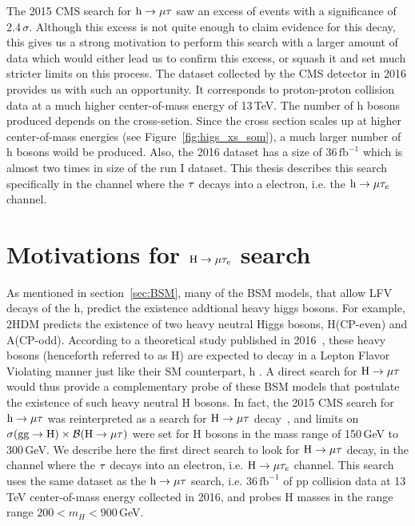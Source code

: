 The 2015 CMS search for $\text{h} \to \mu \tau$ saw an excess of events with a significance of 2.4\,$\sigma$. Although this excess is not quite enough to claim evidence for this decay, this gives us a strong motivation to perform this search with a larger amount of data which would either lead us to confirm this excess, or squash it and set much stricter limits on this process. The dataset collected by the CMS detector in 2016 provides us with such an opportunity. It corresponds to proton-proton collision data at a much higher center-of-mass energy of 13\,TeV. The number of h bosons produced depends on the cross-setion. Since the cross section scales up at higher center-of-mass energies (see Figure~\ref{fig:higs_xs_som}), a much larger number of h bosons woild be produced. Also, the 2016 dataset has a size of 36\,$\mathrm{fb}^{-1}$ which is almost two times in size of the run I dataset. This thesis describes this search specifically in the channel where the $\tau$ decays into a electron, i.e. the $\text{h} \to \mu \tau_{e}$ channel.   

\section{Motivations for $\text{H} \to \mu \tau_{e}$ search}
As mentioned in section~\ref{sec:BSM}, many of the BSM models, that allow LFV decays of the h, predict the existence addtional heavy higgs bosons. For example, 2HDM predicts the existence of two heavy neutral Higgs bosons, H(CP-even) and A(CP-odd). According to a theoretical study published in 2016~\cite{PhysRevD.93.055021}, these heavy bosons (henceforth referred to as H) are expected to decay in a Lepton Flavor Violating manner just like their SM counterpart, h . A direct search for $\text{H} \to \mu \tau$ would thus provide a complementary probe of these BSM models that postulate the existence of such heavy neutral H bosons. In fact, the 2015 CMS search for $\text{h} \to \mu \tau$ was reinterpreted as a search for $\text{H} \to \mu \tau$ decay~\cite{Buschmann:2016pb}, and limits on $\sigma(\textrm{gg}\rightarrow \text{H})\times\mathcal{B}(\text{H} \to \mu \tau)$ were set for H bosons in the mass range of 150\,GeV to 300\,GeV. We describe here the first direct search to look for $\text{H} \to \mu \tau$ decay, in the channel where the $\tau$ decays into an electron, i.e. $\text{H} \to \mu \tau_{e}$ channel. This search uses the same dataset as the $\text{h} \to \mu \tau$ search, i.e. 36\,$\mathrm{fb}^{-1}$ of pp collision data at 13 TeV center-of-mass energy collected in 2016, and probes H masses in the range range $200<m_H<900$\,GeV. 

